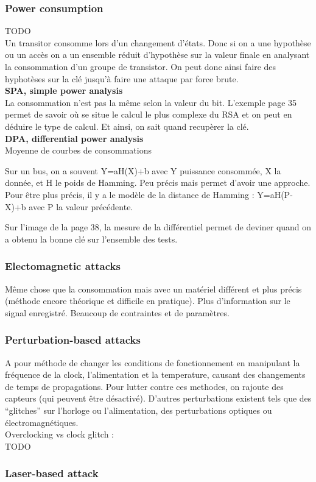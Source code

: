 \documentclass[a4paper,12pt]{article}
\begin{document}
\subsubsection{Power consumption}
TODO
\\
Un transitor consomme lors d'un changement d'états. Donc si on a une hypothèse ou un accès on a un ensemble réduit d'hypothèse sur la valeur finale en analysant la consommation d'un groupe de transistor. On peut donc ainsi faire des hyphotèses sur la clé jusqu'à faire une attaque par force brute.\\
\large{\textbf{SPA, simple power analysis}}\\
La consommation n'est pas la même selon la valeur du bit.
L'exemple page 35 permet de savoir où se situe le calcul le plus complexe du RSA et on peut en déduire le type de calcul. Et ainsi, on sait quand recupèrer la clé.\\
\large{\textbf{DPA, differential power analysis}}\\
Moyenne de courbes de consommations

Sur un bus, on a souvent Y=aH(X)+b avec Y puissance consommée, X la donnée, et H le poids de Hamming. Peu précis mais permet d'avoir une approche.
Pour être plus précis, il y a le modèle de la distance de Hamming : Y=aH(P-X)+b avec P la valeur précédente.

Sur l'image de la page 38, la mesure de la différentiel permet de deviner quand on a obtenu la bonne clé sur l'ensemble des tests.


\subsubsection{Electomagnetic attacks}
Même chose que la consommation mais avec un matériel différent et plus précis (méthode encore théorique et difficile en pratique). Plus d'information sur le signal enregistré. Beaucoup de contraintes et de paramètres.

\subsubsection{Perturbation-based attacks}
A pour méthode de changer les conditions de fonctionnement en manipulant la fréquence de la clock, l'alimentation et la temperature, causant des changements de temps de propagations. Pour lutter contre ces methodes, on rajoute des capteurs (qui peuvent être désactivé).
D'autres perturbations existent tels que des ``glitches'' sur l'horloge ou l'alimentation, des perturbations optiques ou électromagnétiques.\\

\large Overclocking vs clock glitch : \normalsize \\
TODO\\

\subsubsection{Laser-based attack}
\end{document}
